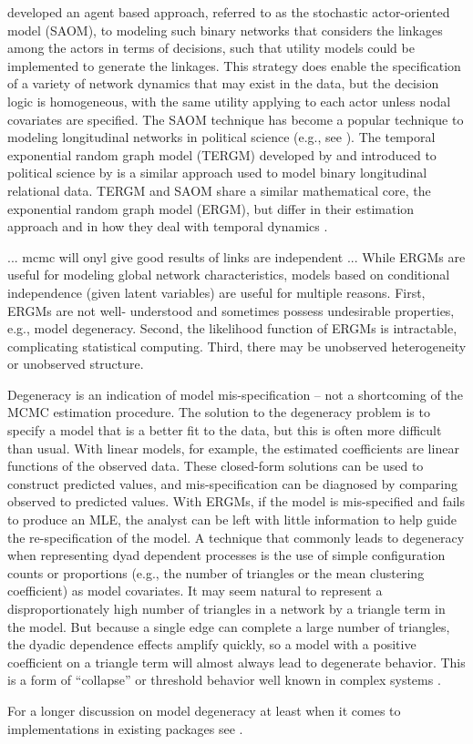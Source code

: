 \citet{snijders:2001} developed an agent based approach, referred to as the stochastic actor-oriented model (SAOM), to modeling such binary networks that considers the linkages among the actors in terms of decisions, such that utility models could be implemented to generate the linkages. This strategy does enable the specification of a variety of network dynamics that may exist in the data, but the decision logic is homogeneous, with the same utility applying to each actor unless nodal covariates are specified. The SAOM technique has become a popular technique to modeling longitudinal networks in political science (e.g., see \citealp{manger:etal:2012, kinne:2013}). The temporal exponential random graph model (TERGM) developed by \citet{hanneke:xing:2007} and introduced to political science by \citet{cranmer:desmarais:2011} is a similar approach used to model binary longitudinal relational data. TERGM and SAOM share a similar mathematical core, the exponential random graph model (ERGM), but differ in their estimation approach and in how they deal with temporal dynamics \citep{leifeld:cranmer:2015}.  

\citet{hunter:etal:2008} %
\citet{bhamidi:etal:2008} ... mcmc will onyl give good results of links are independent
\citet{chatterjee:diaconis:2013} ... 
\citet{shalizi:rinaldo:2013}
\citet{chandrasekhar:jackson:2014}
\citet{jackson:2014}
\citet{hunter:etal:2012}
While ERGMs are useful for modeling global network characteristics, models based on conditional independence (given latent variables) are useful for multiple reasons. First, ERGMs are not well- understood and sometimes possess undesirable properties, e.g., model degeneracy. Second, the likelihood function of ERGMs is intractable, complicating statistical computing. Third, there may be unobserved heterogeneity or unobserved structure.

Degeneracy is an indication of model mis-specification – not a shortcoming of the MCMC estimation procedure. The solution to the degeneracy problem is to specify a model that is a better fit to the data, but this is often more difficult than usual. With linear models, for example, the estimated coefficients are linear functions of the observed data. These closed-form solutions can be used to construct predicted values, and mis-specification can be diagnosed by comparing observed to predicted values. With ERGMs, if the model is mis-specified and fails to produce an MLE, the analyst can be left with little information to help guide the re-specification of the model. A technique that commonly leads to degeneracy when representing dyad dependent processes is the use of simple configuration counts or proportions (e.g., the number of triangles or the mean clustering coefficient) as model covariates. It may seem natural to represent a disproportionately high number of triangles in a network by a triangle term in the model. But because a single edge can complete a large number of triangles, the dyadic dependence effects amplify quickly, so a model with a positive coefficient on a triangle term will almost always lead to degenerate behavior. This is a form of ``collapse'' or threshold behavior well known in complex systems \citep{handcock:etal:2008}.

For a longer discussion on model degeneracy at least when it comes to implementations in existing packages see \citet{handcock:2003b}. 